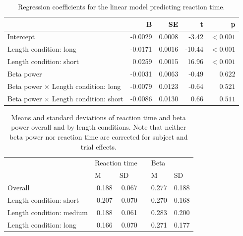 \documentclass[man,floatsintext]{apa6} %
\begin{document}
\begin{table}[!h]
  \caption{Regression coefficients for the linear model predicting reaction time.}
  \begin{flushleft}
    \begin{tabular}{lrrrr}
      \toprule
                                                    & B        & SE         & t       & p         \\
      \midrule
      Intercept                                     & -0.0029  & 0.0008     &  -3.42  & $< 0.001$ \\
      Length condition: long                        & -0.0171  & 0.0016     & -10.44  & $< 0.001$ \\
      Length condition: short                       &  0.0259  & 0.0015     &  16.96  & $< 0.001$ \\
      Beta power                                    & -0.0031  & 0.0063     &  -0.49  & $0.622$   \\
      Beta power $\times$ Length condition: long    & -0.0079  & 0.0123     &  -0.64  & $0.521$   \\
      Beta power $\times$ Length condition: short   & -0.0086  & 0.0130     &   0.66  & $0.511$   \\
      \bottomrule
    \end{tabular}
  \end{flushleft}
  \label{tbl:regression}
\end{table}

\begin{table}[!h]
  \caption{Means and standard deviations of reaction time and beta power overall and by length conditions. Note that neither beta power nor reaction time are corrected for subject and trial effects.}
  \begin{flushleft}
    \begin{tabular}{lrrrrr}
      \toprule
                               & \multicolumn{2}{l}{Reaction time}              && \multicolumn{2}{l}{Beta}                       \\ \cmidrule{2-3} \cmidrule{5-6}
                               & \multicolumn{1}{l}{M} & \multicolumn{1}{l}{SD} && \multicolumn{1}{l}{M} & \multicolumn{1}{l}{SD} \\
      \midrule
      Overall                  & 0.188                 &  0.067                 && 0.277                 & 0.188                  \\
      Length condition: short  & 0.207                 &  0.070                 && 0.270                 & 0.168                  \\
      Length condition: medium & 0.188                 &  0.061                 && 0.283                 & 0.200                  \\
      Length condition: long   & 0.166                 &  0.070                 && 0.271                 & 0.177                  \\
      \bottomrule
    \end{tabular}
  \end{flushleft}
  \label{tbl:descriptives}
\end{table}
\end{document}
